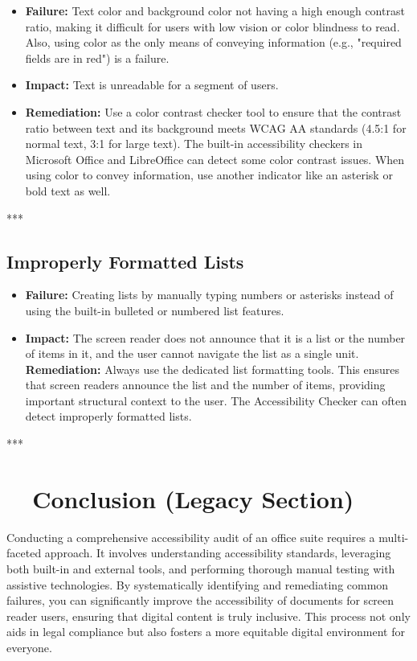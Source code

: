 \begin{itemize}
	\item \textbf{Failure:} Text color and background color not having a high enough contrast ratio, making it difficult for users with low vision or color blindness to read. Also, using color as the only means of conveying information (e.g., "required fields are in red") is a failure.
	\item \textbf{Impact:} Text is unreadable for a segment of users.
	\item \textbf{Remediation:} Use a color contrast checker tool to ensure that the contrast ratio between text and its background meets \gls{WCAG} AA standards (4.5:1 for normal text, 3:1 for large text). The built-in accessibility checkers in Microsoft Office and LibreOffice can detect some color contrast issues. When using color to convey information, use another indicator like an asterisk or bold text as well.
\end{itemize}

***

\subsection{Improperly Formatted Lists}
\label{sub:improperly-formatted-lists}

\begin{itemize}
	\item \textbf{Failure:} Creating lists by manually typing numbers or asterisks instead of using the built-in bulleted or numbered list features.
	\item \textbf{Impact:} The screen reader does not announce that it is a list or the number of items in it, and the user cannot navigate the list as a single unit.
	      \textbf{Remediation:} Always use the dedicated list formatting tools. This ensures that screen readers announce the list and the number of items, providing important structural context to the user. The Accessibility Checker can often detect improperly formatted lists.
\end{itemize}

***

\section{~~Conclusion (Legacy Section)}
\label{ch20:sec:conclusion-legacy}

Conducting a comprehensive accessibility audit of an office suite requires a multi-faceted approach. It involves understanding accessibility standards, leveraging both built-in and external tools, and performing thorough manual testing with assistive technologies. By systematically identifying and remediating common failures, you can significantly improve the accessibility of documents for screen reader users, ensuring that digital content is truly inclusive. This process not only aids in legal compliance but also fosters a more equitable digital environment for everyone.
